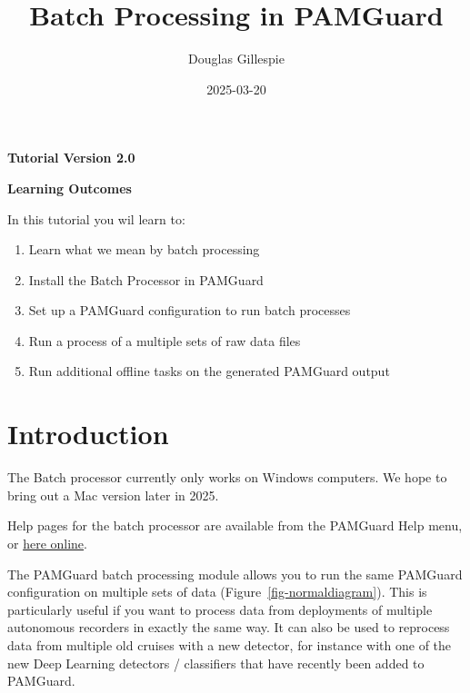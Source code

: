 \documentclass[
]{article}
\title{Batch Processing in PAMGuard}
\author[1]{Douglas Gillespie}
\affil[1]{Sea Mammal Research Unit, University of St Andrews}
\date{2025-03-20}
\renewcommand*\contentsname{Table of contents}
\newcommand\contentsname{Table of contents}
\begin{document}
\maketitle

\centerline{\textbf{Tutorial Version 2.0}}
\vspace{3cm}


\centerline{\textbf{Learning Outcomes}}

In this tutorial you wil learn to:
\begin{enumerate}
\item Learn what we mean by batch processing
\item Install the Batch Processor in PAMGuard
\item Set up a PAMGuard configuration to run batch processes
\item Run a process of a multiple sets of raw data files
\item Run additional offline tasks on the generated PAMGuard output
\end{enumerate}
\newpage

\renewcommand*\contentsname{Table of contents}
{
\hypersetup{linkcolor=}
\setcounter{tocdepth}{3}
\tableofcontents
}
\listoffigures

\newpage{}

\pagestyle{plain}

\section{Introduction}\label{introduction}

The Batch processor currently only works on Windows computers. We hope
to bring out a Mac version later in 2025.

Help pages for the batch processor are available from the PAMGuard Help
menu, or
\href{https://www.pamguard.org/batchhelp/docs/batchoverview.html}{here
online}.

The PAMGuard batch processing module allows you to run the same PAMGuard
configuration on multiple sets of data (Figure~\ref{fig-normaldiagram}).
This is particularly useful if you want to process data from deployments
of multiple autonomous recorders in exactly the same way. It can also be
used to reprocess data from multiple old cruises with a new detector,
for instance with one of the new Deep Learning detectors / classifiers
that have recently been added to PAMGuard.
\end{document}
